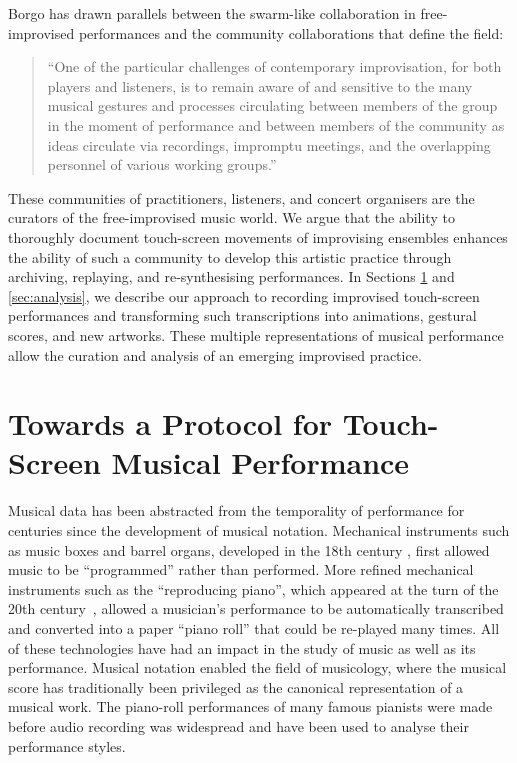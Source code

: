 \documentclass[graybox]{svmult}
\begin{document}
Borgo has drawn parallels between the swarm-like collaboration in
free-improvised performances and the community collaborations that
define the field: 
\begin{quote}
``One of the particular challenges of contemporary
improvisation, for both players and listeners, is to remain aware of
and sensitive to the many musical gestures and processes circulating
between members of the group in the moment of performance and between
members of the community as ideas circulate via recordings, impromptu
meetings, and the overlapping personnel of various working
groups.'' \citep{Borgo:2006fv} 
\end{quote}
These communities of practitioners, listeners, and concert organisers
are the curators of the free-improvised music world. We argue that the
ability to thoroughly document touch-screen movements of improvising
ensembles enhances the ability of such a community to develop this
artistic practice through archiving, replaying, and re-synthesising
performances. In Sections \ref{sec:protocols} and \ref{sec:analysis},
we describe our approach to recording improvised touch-screen
performances and transforming such transcriptions into animations,
gestural scores, and new artworks. These multiple representations of
musical performance allow the curation and analysis of an emerging
improvised practice.

\section{Towards a Protocol for Touch-Screen Musical Performance}
\label{sec:protocols}

Musical data has been abstracted from the temporality of performance
for centuries since the development of musical notation. Mechanical
instruments such as music boxes and barrel organs, developed in the
18th century \citep{Fowler:1967kq}, first allowed music to be
``programmed'' rather than performed. More refined mechanical
instruments such as the ``reproducing piano'', which appeared at the
turn of the 20th century~\cite{Kapur:2005fk}, allowed a musician's
performance to be automatically transcribed and converted into a paper
``piano roll'' that could be re-played many times. All of these
technologies have had an impact in the study of music as well as its
performance. Musical notation enabled the field of musicology, where
the musical score has traditionally been privileged as the canonical
representation of a musical work. The piano-roll performances of many
famous pianists were made before audio recording was widespread and
have been used to analyse their performance styles.
\end{document}
